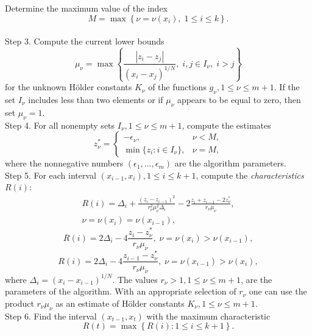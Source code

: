 \documentclass[twocolumn]{svjour3}          %
\begin{document}
	Determine the maximum value of the index 
$$
	M=\max\left\{\nu=\nu(x_i), \; 1 \leq i \leq k \right \}.
$$ \\
Step 3. Compute the current lower bounds
\begin{equation}\label{current_lower_bounds}
	\mu_{\nu} = \max\left\{ \frac{\left|z_i-z_j\right|}{ (x_i - x_j)^{1/N} }, \; i,j \in I_\nu, \; i>j \right\}
\end{equation}
for the unknown H\"{o}lder constants $K_{\nu}$ of the functions $g_{\nu}, 1 \leq \nu \leq m+1$. If the set $I_{\nu}$ includes less than two elements or if $\mu_{\nu}$ appears to be equal to zero, then set $\mu_{\nu}=1$. \\
Step 4. For all nonempty sets $I_{\nu}, 1 \leq \nu \leq m+1$, compute the estimates
\begin{equation}\label{z_estimates}
	z_\nu^\ast = \left\{
   \begin{array}{lr}
     -\epsilon_\nu, & \nu < M,\\
     \min\{ z_i: i\in I_\nu \}, & \nu = M,
   \end{array}
	\right.
\end{equation}
where the nonnegative numbers $(\epsilon_1,\ldots,\epsilon_m )$ are the algorithm parameters. \\
Step 5. For each interval $(x_{i-1}, x_i), 1 \leq i \leq k+1$, compute the \textit{characteristics} $R(i)$:
\begin{align}\label{R_1}
	R(i)=\Delta_i+\frac{(z_i-z_{i-1})^2}{r_\nu^2 \mu_\nu^2\Delta_i}-2\frac{z_i+z_{i-1}-2z_\nu^\ast}{r_\nu \mu_\nu}, \nonumber \\ 
 \nu=\nu(x_i)=\nu(x_{i-1}),
\end{align}
\begin{equation}\label{R_2}
	R(i)=2\Delta_i-4\frac{z_i-z_\nu^\ast}{r_\nu \mu_\nu}, \; \nu=\nu(x_i)>\nu(x_{i-1}),
\end{equation}
\begin{equation}\label{R_3}
R(i)=2\Delta_i-4\frac{z_{i-1}-z_\nu^\ast}{r_\nu \mu_\nu}, \; \nu=\nu(x_{i-1})>\nu(x_i),
\end{equation}
where $\Delta_i=(x_i-x_{i-1})^{1/N}$. The values $r_{\nu} > 1, 1 \leq \nu \leq m+1$, are the parameters of the algorithm. With an appropriate selection of $r_{\nu}$ one can use the product $r_{\nu}\mu_{\nu}$ as an estimate of H\"{o}lder constants $K_{\nu}, 1 \leq \nu \leq m+1$. \\
Step 6. Find the interval $(x_{t-1}, x_t)$ with the maximum characteristic
\begin{equation}\label{MaxR}
	R(t)=\max{\left\{R(i): 1 \leq i \leq k+1\right\}}.
\end{equation} 
\end{document}
